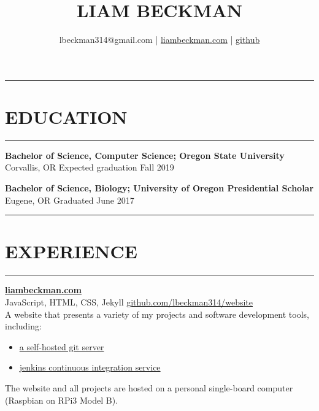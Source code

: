 \documentclass[a4paper]{article}
\title{LIAM BECKMAN}
\author{lbeckman314@gmail.com |  \href{https://liambeckman.com}{liambeckman.com} | \href{https://github.com/lbeckman314}{github}}
\date{\vspace{-5ex}}
\begin{document}
\maketitle

\noindent\rule{\textwidth}{1pt}\vspace{-1.5em}
\section*{EDUCATION}\vspace{-1.5em}
\textcolor[RGB]{128,128,128}{\rule{\linewidth}{1pt}}

\medbreak

\textbf{Bachelor of Science, Computer Science; Oregon State University}\\ 
\textcolor[RGB]{128,128,128}{Corvallis, OR \hfill Expected graduation Fall 2019}

\medbreak

\textbf{Bachelor of Science, Biology; University of Oregon Presidential Scholar}\\ 
\textcolor[RGB]{128,128,128}{Eugene, OR \hfill Graduated June 2017}

\noindent\rule{\textwidth}{1pt}\vspace{-1.5em}
\section*{EXPERIENCE}\vspace{-1.5em}
\textcolor[RGB]{128,128,128}{\rule{\linewidth}{1pt}}


\textbf{\href{https://liambeckman.com}{liambeckman.com}}\\
\textcolor[RGB]{128,128,128}{JavaScript, HTML, CSS, Jekyll \hfill \href{https://github.com/lbeckman314/website}{github.com/lbeckman314/website}}\\

A website that presents a variety of my projects and software development tools, including:

\begin{itemize}
    \item \href{https://git.liambeckman.com}{a self-hosted git server}
    \item \href{https://liambeckman.com/jenkins}{jenkins continuous integration service}
\end{itemize}

The website and all projects are hosted on a personal single-board computer (Raspbian on RPi3 Model B).
\end{document}
